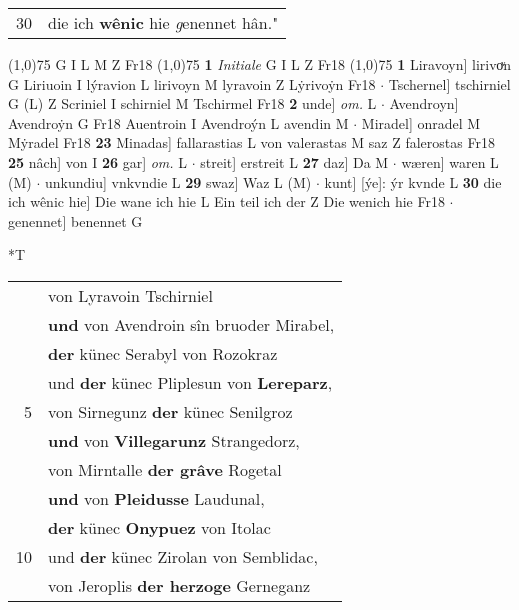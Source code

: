 \documentclass[8pt,a4paper,notitlepage]{article}
\begin{document}
\begin{table}[ht]
\begin{minipage}[t]{0.5\linewidth}
\begin{tabular}{rl}
30 & die ich \textbf{wênic} hie \textit{g}enennet hân."\\ 
\end{tabular}
\scriptsize
\line(1,0){75} \newline
G I L M Z Fr18 \newline
\line(1,0){75} \newline
\textbf{1} \textit{Initiale} G I L Z Fr18  \newline
\line(1,0){75} \newline
\textbf{1} Liravoyn] lirivoͮn G Liriuoin I lýravion L lirivoyn M lyravoin Z Lẏrivoẏn Fr18  $\cdot$ Tschernel] tschirniel G (L) Z Scriniel I schirniel M Tschirmel Fr18 \textbf{2} unde] \textit{om.} L  $\cdot$ Avendroyn] Avendroẏn G Fr18 Auentroin I Avendroýn L avendin M  $\cdot$ Miradel] onradel M Mẏradel Fr18 \textbf{23} Minadas] fallarastias L von valerastas M saz Z falerostas Fr18 \textbf{25} nâch] von I \textbf{26} gar] \textit{om.} L  $\cdot$ streit] erstreit L \textbf{27} daz] Da M  $\cdot$ wæren] waren L (M)  $\cdot$ unkundiu] vnkvndie L \textbf{29} swaz] Waz L (M)  $\cdot$ kunt] [ýe]: ýr kvnde L \textbf{30} die ich wênic hie] Die wane ich hie L Ein teil ich der Z Die wenich hie Fr18  $\cdot$ genennet] benennet G \newline
\end{minipage}
\hspace{0.5cm}
\begin{minipage}[t]{0.5\linewidth}
\small
\begin{center}*T
\end{center}
\begin{tabular}{rl}
 & von Lyravoin Tschirniel\\ 
 & \textbf{und} von Avendroin sîn bruoder Mirabel,\\ 
 & \textbf{der} künec Serabyl von Rozokraz\\ 
 & und \textbf{der} künec Pliplesun von \textbf{Lereparz},\\ 
5 & von Sirnegunz \textbf{der} künec Senilgroz\\ 
 & \textbf{und} von \textbf{Villegarunz} Strangedorz,\\ 
 & von Mirntalle \textbf{der grâve} Rogetal\\ 
 & \textbf{und} von \textbf{Pleidusse} Laudunal,\\ 
 & \textbf{der} künec \textbf{Onypuez} von Itolac\\ 
10 & und \textbf{der} künec Zirolan von Semblidac,\\ 
 & von Jeroplis \textbf{der herzoge} Gerneganz\\ 

\end{tabular}
\end{minipage}
\end{table}
\end{document}

